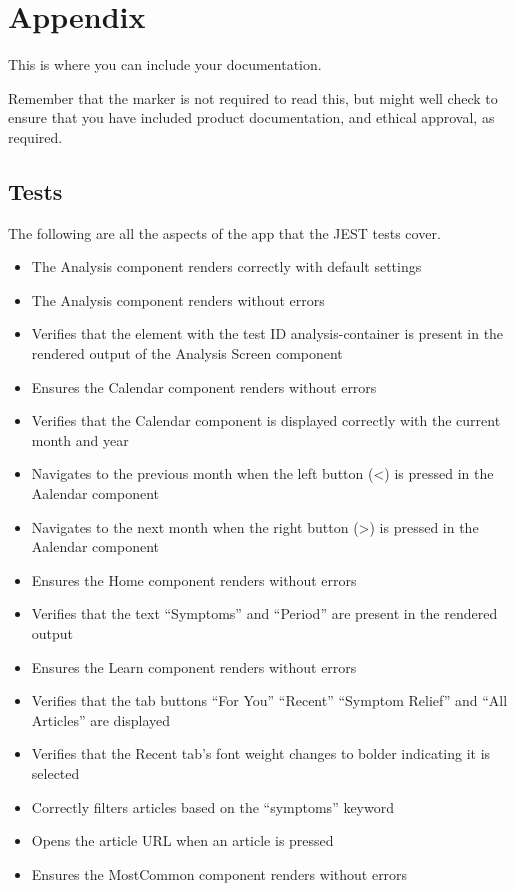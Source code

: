 \section{Appendix}

This is where you can include your documentation.

Remember that the marker is not required to read this, but might well check to ensure that you have included product documentation, and ethical approval, as required.
\subsection{Tests}
The following are all the aspects of the app that the JEST tests cover.
\begin{itemize}
  \item The Analysis component renders correctly with default settings
  \item The Analysis component renders without errors
  \item Verifies that the element with the test ID analysis-container is present in the rendered output of the Analysis Screen component
  \item Ensures the Calendar component renders without errors
  \item Verifies that the Calendar component is displayed correctly with the current month and year
  \item Navigates to the previous month when the left button (<) is pressed in the Aalendar component
  \item Navigates to the next month when the right button (>) is pressed in the Aalendar component
  \item Ensures the Home component renders without errors
  \item Verifies that the text ``Symptoms'' and ``Period'' are present in the rendered output
  \item Ensures the Learn component renders without errors
  \item Verifies that the tab buttons ``For You'' ``Recent'' ``Symptom Relief'' and ``All Articles'' are displayed
  \item Verifies that the Recent tab's font weight changes to bolder indicating it is selected
  \item Correctly filters articles based on the ``symptoms'' keyword
  \item Opens the article URL when an article is pressed
  \item Ensures the MostCommon component renders without errors

\end{itemize}

